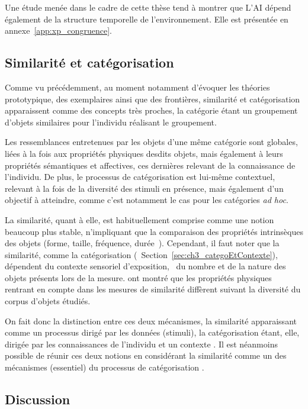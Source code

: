 Une étude menée dans le cadre de cette thèse tend à montrer que L'AI dépend également de la structure temporelle de l'environnement. Elle est présentée en annexe~\ref{app:xp_congruence}. 

\subsection{Similarité et catégorisation}

Comme vu précédemment, au moment notamment d'évoquer les théories prototypique, des exemplaires ainsi que des frontières, similarité et catégorisation apparaissent comme des concepts très proches, la catégorie étant un groupement d'objets similaires pour l'individu réalisant le groupement.

Les ressemblances entretenues par les objets d'une même catégorie sont globales, liées à la fois aux propriétés physiques desdits objets, mais également à leurs propriétés sémantiques et affectives, ces dernières relevant de la connaissance de l'individu. De plus, le processus de catégorisation est lui-même contextuel, relevant à la fois de la diversité des stimuli en présence, mais également d'un objectif à atteindre, comme c'est notamment le cas pour les catégories \emph{ad hoc}.

La similarité, quant à elle, est habituellement comprise comme une notion beaucoup plus stable, n'impliquant que la comparaison des propriétés intrinsèques des objets (forme, taille, fréquence, durée~\etc). Cependant, il faut noter que la similarité, comme la catégorisation (\cf~Section~\ref{sec:ch3_categoEtContexte}), dépendent du contexte sensoriel d'exposition, \ie~du nombre et de la nature des objets présents lors de la mesure. \citep{tversky1977features,tversky1978studies} ont montré que les propriétés physiques rentrant en compte dans les mesures de similarité diffèrent suivant la diversité du corpus d'objets étudiés.

On fait donc la distinction entre ces deux mécanismes, la similarité apparaissant comme un processus dirigé par les données (stimuli), la catégorisation étant, elle, dirigée par les connaissances de l'individu et un contexte \citep[p. 59]{Houix03f}. Il est néanmoins possible de réunir ces deux notions en considérant la similarité comme un des mécanismes (essentiel) du processus de catégorisation \citep[p. 61-65]{Houix03f}. 

\subsection{Discussion}

